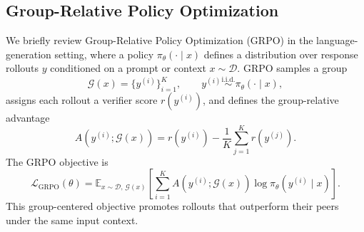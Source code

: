\subsection{Group-Relative Policy Optimization} \label{sec:prelim-grpo}
We briefly review Group-Relative Policy Optimization (GRPO) in the language-generation setting, where a policy $\pi_\theta(\cdot \mid x)$ defines a distribution over response rollouts $y$ conditioned on a prompt or context $x \sim \mathcal{D}$. 
GRPO samples a group
\begin{equation} \label{eq:group_sampling}
\mathcal{G}(x)=\{y^{(i)}\}_{i=1}^K,
\qquad
y^{(i)} \stackrel{\mathrm{i.i.d.}}{\sim} \pi_\theta(\cdot \mid x),
\end{equation}
assigns each rollout a verifier score $r(y^{(i)})$, and defines the group-relative advantage
\begin{equation} \label{eq:grpo_adv}
A\!\left(y^{(i)};\mathcal{G}(x)\right)
=
r\!\left(y^{(i)}\right)
-
\frac{1}{K}\sum_{j=1}^K r\!\left(y^{(j)}\right).
\end{equation}
The GRPO objective is
\begin{equation} \label{eq:grpo_obj}
\mathcal{L}_{\mathrm{GRPO}}(\theta)
=
\mathbb{E}_{x \sim \mathcal{D},\, \mathcal{G}(x)}
\left[
\sum_{i=1}^K
A\!\left(y^{(i)};\mathcal{G}(x)\right)
\log \pi_\theta\!\left(y^{(i)} \mid x\right)
\right].
\end{equation}
This group-centered objective promotes rollouts that outperform their peers under the same input context.
